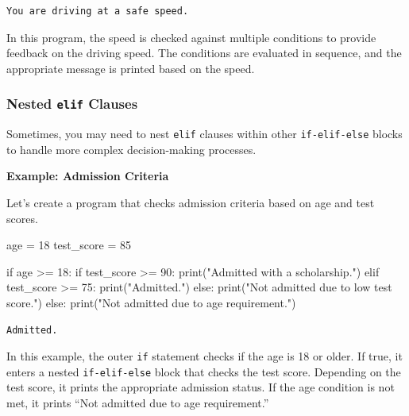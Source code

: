 \documentclass[
  letterpaper,
  DIV=11,
  numbers=noendperiod]{scrreprt}
\newenvironment{Shaded}{\begin{snugshade}}{\end{snugshade}}
\newcommand{\BuiltInTok}[1]{\textcolor[rgb]{0.00,0.23,0.31}{#1}}
\newcommand{\ControlFlowTok}[1]{\textcolor[rgb]{0.00,0.23,0.31}{#1}}
\newcommand{\DecValTok}[1]{\textcolor[rgb]{0.68,0.00,0.00}{#1}}
\newcommand{\NormalTok}[1]{\textcolor[rgb]{0.00,0.23,0.31}{#1}}
\newcommand{\OperatorTok}[1]{\textcolor[rgb]{0.37,0.37,0.37}{#1}}
\newcommand{\StringTok}[1]{\textcolor[rgb]{0.13,0.47,0.30}{#1}}
\begin{document}
\begin{verbatim}
You are driving at a safe speed.
\end{verbatim}

In this program, the speed is checked against multiple conditions to
provide feedback on the driving speed. The conditions are evaluated in
sequence, and the appropriate message is printed based on the speed.

\hypertarget{nested-elif-clauses}{%
\subsubsection{\texorpdfstring{Nested \texttt{elif}
Clauses}{Nested elif Clauses}}\label{nested-elif-clauses}}

Sometimes, you may need to nest \texttt{elif} clauses within other
\texttt{if-elif-else} blocks to handle more complex decision-making
processes.

\textbf{Example: Admission Criteria}

Let's create a program that checks admission criteria based on age and
test scores.

\begin{Shaded}
\begin{Highlighting}[]
\NormalTok{age }\OperatorTok{=} \DecValTok{18}
\NormalTok{test\_score }\OperatorTok{=} \DecValTok{85}

\ControlFlowTok{if}\NormalTok{ age }\OperatorTok{\textgreater{}=} \DecValTok{18}\NormalTok{:}
    \ControlFlowTok{if}\NormalTok{ test\_score }\OperatorTok{\textgreater{}=} \DecValTok{90}\NormalTok{:}
        \BuiltInTok{print}\NormalTok{(}\StringTok{"Admitted with a scholarship."}\NormalTok{)}
    \ControlFlowTok{elif}\NormalTok{ test\_score }\OperatorTok{\textgreater{}=} \DecValTok{75}\NormalTok{:}
        \BuiltInTok{print}\NormalTok{(}\StringTok{"Admitted."}\NormalTok{)}
    \ControlFlowTok{else}\NormalTok{:}
        \BuiltInTok{print}\NormalTok{(}\StringTok{"Not admitted due to low test score."}\NormalTok{)}
\ControlFlowTok{else}\NormalTok{:}
    \BuiltInTok{print}\NormalTok{(}\StringTok{"Not admitted due to age requirement."}\NormalTok{)}
\end{Highlighting}
\end{Shaded}

\begin{verbatim}
Admitted.
\end{verbatim}

In this example, the outer \texttt{if} statement checks if the age is 18
or older. If true, it enters a nested \texttt{if-elif-else} block that
checks the test score. Depending on the test score, it prints the
appropriate admission status. If the age condition is not met, it prints
``Not admitted due to age requirement.''
\end{document}
